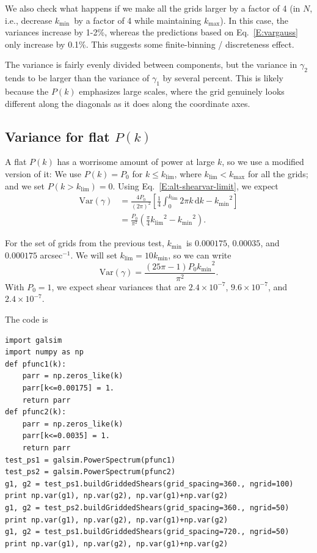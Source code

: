 \documentclass[preprint]{aastex}
\newcommand{\klim}{\ensuremath{k_\mathrm{lim}}}
\newcommand{\kmax}{\ensuremath{k_\mathrm{max}}}
\newcommand{\kmin}{\ensuremath{k_\mathrm{min}}}
\newcommand{\rmd}{\ensuremath{\mathrm{d}}}
\newcommand{\beq}{\begin{equation}}
\newcommand{\eeq}{\end{equation}}
\begin{document}
We also check what happens if we make all the grids larger by a factor
of 4 (in $N$, i.e., decrease \kmin\ by a factor of 4 while maintaining
\kmax).  In this case, the variances increase by 1-2\%, whereas the 
predictions  based on Eq.~\ref{E:vargauss} only increase by 0.1\%.
This suggests some finite-binning / discreteness effect.

The variance is fairly evenly divided between components, but the
variance in $\gamma_2$ tends to be larger than the variance of
$\gamma_1$ by several percent.  This is
likely because the $P(k)$ emphasizes large scales, where the grid
genuinely looks different along the diagonals as it does along the
coordinate axes.

\subsection{Variance for flat $P(k)$}

A flat $P(k)$ has a worrisome amount of power at large $k$, so we use
a modified version of it: We use $P(k)=P_0$ for $k\le$\klim, where
$\klim<\kmax$ for all the grids; and we set $P(k>\klim)=0$. Using
Eq.~\ref{E:alt-shearvar-limit}, we expect
\begin{align}
\mathrm{Var}(\gamma) &= \frac{4P_0}{(2\pi)^2}
\left[\frac{1}{4}\int_{0}^{\klim} 2\pi k\,\rmd k - \kmin^2\right] \\
 &= \frac{P_0}{\pi^2} \left(\frac{\pi}{4} \klim^2 - \kmin^2\right).
\end{align}

For the set of grids from the previous test, \kmin\ is
$0.000175$, $0.00035$, and $0.000175$ arcsec$^{-1}$.  We will set $\klim=10\kmin$,
so we can write
\beq
\mathrm{Var}(\gamma) = \frac{(25\pi-1) P_0 \kmin^2}{\pi^2}.
\eeq
With $P_0=1$, we expect
shear variances that are $2.4\times 10^{-7}$, $9.6\times 10^{-7}$,
and $2.4\times 10^{-7}$.

The code is
\begin{verbatim}
import galsim
import numpy as np
def pfunc1(k):
    parr = np.zeros_like(k)
    parr[k<=0.00175] = 1.
    return parr
def pfunc2(k):
    parr = np.zeros_like(k)
    parr[k<=0.0035] = 1.
    return parr
test_ps1 = galsim.PowerSpectrum(pfunc1)
test_ps2 = galsim.PowerSpectrum(pfunc2)
g1, g2 = test_ps1.buildGriddedShears(grid_spacing=360., ngrid=100)
print np.var(g1), np.var(g2), np.var(g1)+np.var(g2)
g1, g2 = test_ps2.buildGriddedShears(grid_spacing=360., ngrid=50)
print np.var(g1), np.var(g2), np.var(g1)+np.var(g2)
g1, g2 = test_ps1.buildGriddedShears(grid_spacing=720., ngrid=50)
print np.var(g1), np.var(g2), np.var(g1)+np.var(g2)
\end{verbatim}
\end{document}
